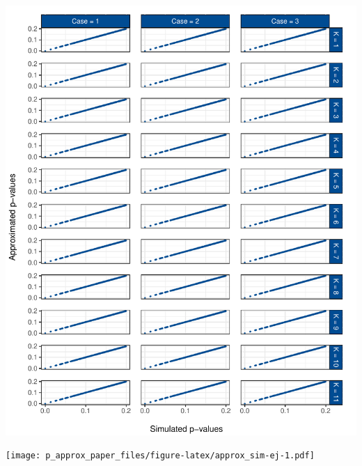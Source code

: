 \documentclass[12pt,a4paper]{article}
\let\origfigure\figure
\let\endorigfigure\endfigure
\renewenvironment{figure}[1][2] {
    \expandafter\origfigure\expandafter[H]
} {
    \endorigfigure
}
\begin{document}
\begin{figure}
\centering
\includegraphics{p_approx_paper_files/figure-latex/approx_sim-all_0.2-1.pdf}
\caption{\label{fig:sim_approx_all_0.2} Simulated vs.~approximated
\(p\)-values for the lower tail of the distribution for all cases and
all underlying test.}
\end{figure}

\begin{figure}
\centering
\texttt{[image: p\_approx\_paper\_files/figure-latex/approx\_sim-ej-1.pdf]}
\caption{\label{fig:sim_approx_e_j} Simulated against approximated
\(p\)-values over the whole distribution for all cases and EJ test
type.}
\end{figure}
\end{document}
